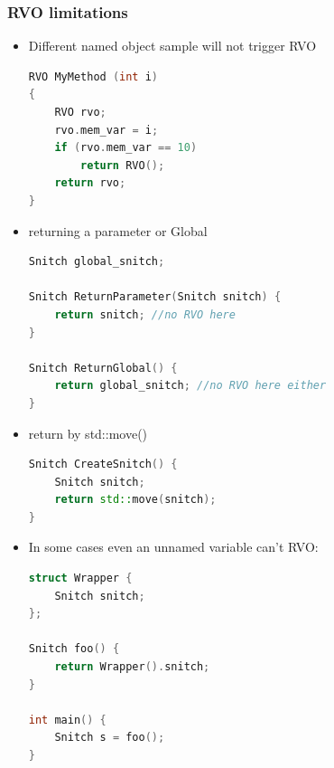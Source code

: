 \documentclass[a4paper,11pt,twoside]{book}
\begin{document}
\subsubsection{RVO limitations}
\begin{itemize}
	\item Different named object sample will not trigger RVO
	\begin{lstlisting}[frame=single, language=c++, mathescape=true]
RVO MyMethod (int i)
{
	RVO rvo;
	rvo.mem_var = i;
	if (rvo.mem_var == 10)
		return RVO();
	return rvo; 
}
	\end{lstlisting}
	
	\item returning a parameter or Global
\begin{lstlisting}[frame=single, language=c++, mathescape=true]
Snitch global_snitch;

Snitch ReturnParameter(Snitch snitch) {
	return snitch; //no RVO here
}

Snitch ReturnGlobal() {
	return global_snitch; //no RVO here either
}
\end{lstlisting}

\item return by std::move()
\begin{lstlisting}[frame=single, language=c++, mathescape=true]
Snitch CreateSnitch() {
	Snitch snitch;
	return std::move(snitch);
}
\end{lstlisting}
	
\item In some cases even an unnamed variable can't RVO:
\begin{lstlisting}[frame=single, language=c++, mathescape=true]
struct Wrapper {
	Snitch snitch;
};

Snitch foo() {
	return Wrapper().snitch;
}

int main() {
	Snitch s = foo();
}
\end{lstlisting}

\end{itemize}
\end{document}
